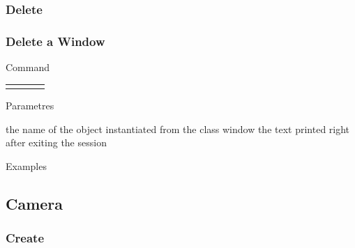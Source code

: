 \documentclass[10pt]{beamer}
\begin{document}
\subsubsection{Delete}

\begin{frame}[t] \frametitle{Delete a Window}

	\begin{block}{Command} 
		\begin{tabularx}{\textwidth}{@{}l@{}l@{}l@{}R}
			 &
				 &
			  	 & \InstrItem
		\end{tabularx}
	\end{block}

	\begin{block}{Parametres} \begin{itemize}
		 the name of the object instantiated from the class window
		    the text printed right after exiting the session
	\end{itemize} \end{block}

	\begin{block}{Examples}
	\end{block}

\end{frame}

\subsection{Camera}

\subsubsection{Create}
\end{document}
